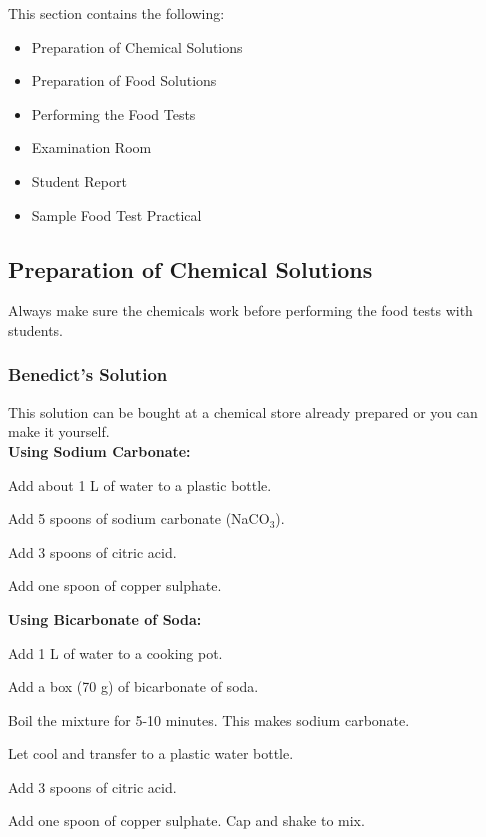 \noindent This section contains the following:
\begin{itemize}
\item{Preparation of Chemical Solutions}
\item{Preparation of Food Solutions}
\item{Performing the Food Tests}
\item{Examination Room}
\item{Student Report}
\item{Sample Food Test Practical}
\end{itemize}

\subsection{Preparation of Chemical Solutions}
Always make sure the chemicals work before performing the food tests with students.

\subsubsection{Benedict's Solution} 
This solution can be bought at a chemical store already prepared or you can make it yourself.\\

\textbf{Using Sodium Carbonate:}
\begin{itemize*}
\item Add about 1 L of water to a plastic bottle.
\item Add 5 spoons of sodium carbonate (NaCO$_3$).
\item Add 3 spoons of citric acid.
\item Add one spoon of copper sulphate.
\end{itemize*}

\textbf{Using Bicarbonate of Soda:}
\begin{itemize*}
\item Add 1 L of water to a cooking pot.
\item Add a box (70 g) of bicarbonate of soda.
\item Boil the mixture for 5-10 minutes. This makes sodium carbonate.
\item Let cool and transfer to a plastic water bottle.
\item Add 3 spoons of citric acid.
\item Add one spoon of copper sulphate. Cap and shake to mix.
\end{itemize*}

